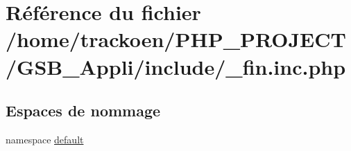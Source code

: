 \hypertarget{__fin_8inc_8php}{\section{Référence du fichier /home/trackoen/\-P\-H\-P\-\_\-\-P\-R\-O\-J\-E\-C\-T/\-G\-S\-B\-\_\-\-Appli/include/\-\_\-fin.inc.\-php}
\label{__fin_8inc_8php}
}
\subsection*{Espaces de nommage}
\begin{DoxyCompactItemize}
\item 
namespace \hyperlink{namespacedefault}{default}
\end{DoxyCompactItemize}
